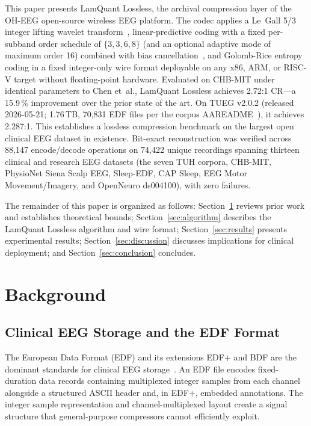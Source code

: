 \documentclass[journal]{IEEEtran}
\begin{document}
This paper presents LamQuant Lossless, the archival compression layer
of the OH-EEG open-source wireless EEG platform. The codec applies a
Le~Gall 5/3 integer lifting wavelet transform~\cite{sweldens1996,itu_t800},
linear-predictive coding with a fixed per-subband order schedule of
$\{3,3,6,8\}$ (and an optional adaptive mode of maximum order 16)
combined with bias cancellation~\cite{sriraam2008}, and Golomb-Rice
entropy coding in a fixed integer-only wire format deployable on any
x86, ARM, or RISC-V target without floating-point hardware. Evaluated on CHB-MIT under identical parameters to Chen et~al.,
LamQuant Lossless achieves 2.72:1 CR---a 15.9\,\% improvement
over the prior state of the art. On TUEG v2.0.2 (released
2026-05-21; 1.76\,TB, 70{,}831 EDF files per the corpus
AAREADME~\cite{tueg_aareadme_v202}), it achieves 2.287:1. This
establishes a lossless compression benchmark on the largest open
clinical EEG dataset in existence. Bit-exact reconstruction was
verified across 88{,}147 encode/decode operations on 74{,}422
unique recordings spanning thirteen clinical and research EEG
datasets (the seven TUH corpora, CHB-MIT, PhysioNet Siena Scalp
EEG, Sleep-EDF, CAP Sleep, EEG Motor Movement/Imagery, and
OpenNeuro ds004100), with zero failures.

The remainder of this paper is organized as follows:
Section~\ref{sec:background} reviews prior work and establishes
theoretical bounds; Section~\ref{sec:algorithm} describes the
LamQuant Lossless algorithm and wire format;
Section~\ref{sec:results} presents experimental results;
Section~\ref{sec:discussion} discusses implications for clinical
deployment; and Section~\ref{sec:conclusion} concludes.


\section{Background}
\label{sec:background}

\subsection{Clinical EEG Storage and the EDF Format}
The European Data Format (EDF) and its extensions EDF+ and BDF are
the dominant standards for clinical EEG storage~\cite{kemp1992}. An
EDF file encodes fixed-duration data records containing multiplexed
integer samples from each channel alongside a structured ASCII header
and, in EDF+, embedded annotations. The integer sample representation
and channel-multiplexed layout create a signal structure that
general-purpose compressors cannot efficiently exploit.
\end{document}

